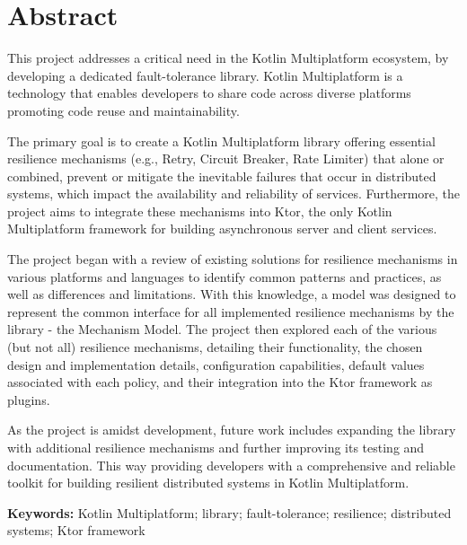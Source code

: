 \chapter*{Abstract}\label{ch:abstract}

This project addresses a critical need in the Kotlin Multiplatform ecosystem,
by developing a dedicated fault-tolerance library.
Kotlin Multiplatform is a technology that enables developers to share code across diverse platforms promoting code reuse and maintainability.

The primary goal is
to create a Kotlin Multiplatform library
offering essential resilience mechanisms (e.g., Retry, Circuit Breaker, Rate Limiter)
that alone or combined, prevent or mitigate the inevitable failures that occur in distributed systems,
which impact the availability and reliability of services.
Furthermore, the project aims to integrate these mechanisms into Ktor,
the only Kotlin Multiplatform framework for building asynchronous server and client services.

The project began with a review of existing solutions for resilience mechanisms in various platforms and languages
to identify common patterns and practices, as well as differences and limitations.
With this knowledge,
a model was designed to represent the common interface for all implemented resilience mechanisms by the library -
the Mechanism Model.
The project then explored each of the
various (but not all) resilience mechanisms,
detailing their functionality,
the chosen design and implementation details, configuration capabilities, default values associated with each policy, and their integration into the Ktor framework as plugins.

As the project is amidst development, future work includes
expanding the library with additional resilience mechanisms
and further improving its testing and documentation.
This way providing developers with a comprehensive and reliable toolkit for building resilient distributed systems
in Kotlin Multiplatform.

\textbf{Keywords:} Kotlin Multiplatform; library; fault-tolerance; resilience; distributed systems; Ktor framework
